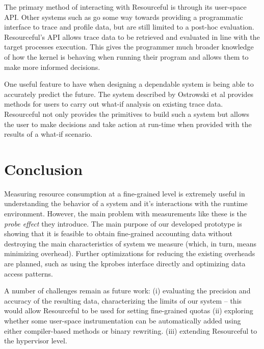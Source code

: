 \documentclass[letterpaper,twocolumn,10pt]{article}
\newcommand{\pname}{Resourceful}
\begin{document}
The primary method of interacting with \pname{ } is through its user-space API.
Other systems such as \cite{fay} go some way towards providing a programmatic
interface to trace and profile data, but are still limited to a post-hoc
evaluation. \pname{}'s API allows trace data to be retrieved and evaluated in
line with the target processes execution. This gives the programmer much
broader knowledge of how the kernel is behaving when running their program and allows
them to make more informed decisions.

One useful feature to have when designing a dependable system is being able to
accurately predict the future. The system described by Ostrowski et al
\cite{ostrowski} provides methods for users to carry out what-if analysis on
existing trace data. \pname{ } not only provides the primitives to build such a
system but allows the user to make decisions and take action at run-time when
provided with the results of a what-if scenario.




\section{Conclusion} 
Measuring resource consumption at a fine-grained level is extremely useful in
understanding the behavior of a system and it's interactions with the runtime
environment. However, the main problem with measurements like these is the
\emph{probe effect} they introduce. The main purpose of our developed prototype
is showing that it is feasible to obtain fine-grained accounting data without
destroying the main characteristics of system we measure (which, in turn, means
minimizing overhead). Further optimizations for reducing the existing overheads
are planned, such as using the kprobes interface directly and optimizing data
access patterns.

A number of challenges remain as future work: (i) evaluating the precision and
accuracy of the resulting data, characterizing the limits of our system -- this
would allow \pname{ }to be used for setting fine-grained quotas (ii) exploring
whether some user-space instrumentation can be automatically added using either
compiler-based methods or binary rewriting. (iii) extending \pname{ } to the hypervisor level.
\end{document}
